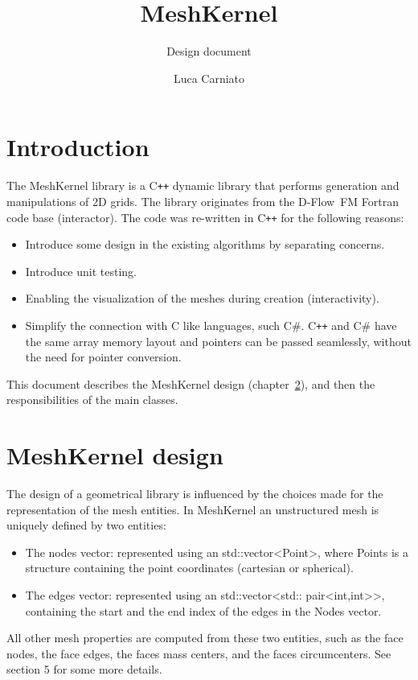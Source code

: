 \documentclass[biblatex]{deltares_manual}
\newcommand{\dflowfm}{D-Flow~FM\xspace}
\newcommand{\cpp}{\mbox{C\texttt{++}}\xspace}
\newcommand{\csharp}{C\#\xspace}
\begin{document}
\underline{}
\title{MeshKernel}
\subtitle{Design document}
\author{Luca Carniato}
\deltarestitle
\chapter{Introduction}

The MeshKernel library is a \cpp dynamic library that performs generation and manipulations of 2D grids. The library originates from the \dflowfm Fortran code base (interactor). The code was re-written in \cpp for the following reasons:
\begin{itemize}
\item Introduce some design in the existing algorithms by separating concerns.
\item Introduce unit testing.
\item Enabling the visualization of the meshes during creation (interactivity).
\item Simplify the connection with C like languages, such \csharp.
\cpp and \csharp have the same array memory layout and pointers can be passed seamlessly, without the need for pointer conversion.
\end{itemize}
This document describes the MeshKernel design (chapter~\ref{chap:design}), and then the responsibilities of the main classes.

\chapter{MeshKernel design}
\label{chap:design}

The design of a geometrical library is influenced by the choices made for the representation of the mesh entities. In MeshKernel an unstructured mesh is uniquely defined by two entities:
\begin{itemize}
\item The nodes vector: represented using an std::vector<Point>, where Points is a structure containing the point coordinates (cartesian or spherical).
\item The edges vector: represented using an std::vector<std:: pair<int,int>>, containing the start and the end index of the edges in the Nodes vector.
\end{itemize}
All other mesh properties are computed from these two entities, such as the face nodes, the face edges, the faces mass centers, and the faces circumcenters. See section 5 for some more details.
\end{document}
